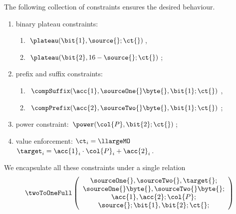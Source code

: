 The following collection of constraints ensures the desired behaviour.
\begin{enumerate}
	\item binary plateau constraints:
	\begin{enumerate}
		\item $\plateau(\bit{1}, \source{}\mark{};\ct{})$,
		\item $\plateau(\bit{2}, 16 - \source{}\mark{};\ct{})$;
	\end{enumerate}
	\item prefix and suffix constraints:
	\begin{enumerate}
		\item $\compSuffix(\acc{1}, \sourceOne{}\byte{}, \bit{1};\ct{})$, %
		\item $\compPrefix(\acc{2}, \sourceTwo{}\byte{}, \bit{1};\ct{})$; %
	\end{enumerate}
	\item power constraint: $\power(\col{P}, \bit{2};\ct{})$;
	\item value enforcement: \If $\ct_{i} = \llargeMO$ \Then $\target_i = \acc{1}_i \cdot \col{P}_i + \acc{2}_i$.
\end{enumerate}
We encapsulate all these constraints under a single relation
\[
	\twoToOneFull
	\left(
	\begin{array}{c}
	\sourceOne{}, \sourceTwo{}, \target{};\\
	\sourceOne{}\byte{}, \sourceTwo{}\byte{};\\
	\acc{1}, \acc{2}; \col{P}; \\
	\source{}\mark{}; \bit{1}, \bit{2}; \ct{};
	\end{array}
	\right)
\]

